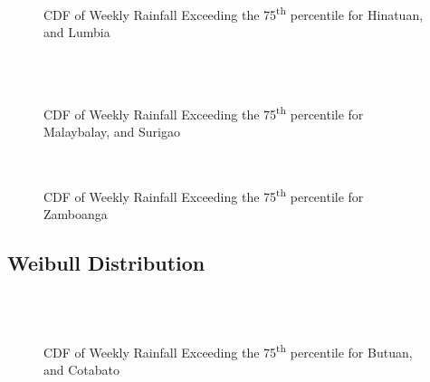 \begin{figure}[H]
  \centering
  \\
  \\
  \caption{CDF of Weekly Rainfall Exceeding the 75\textsuperscript{th} percentile for Hinatuan, and Lumbia}
  \label{fig:weekly_0.90_appendix_gd_pt4}
\end{figure}

\begin{figure}[H]
  \centering
  \\
  \\
  \caption{CDF of Weekly Rainfall Exceeding the 75\textsuperscript{th} percentile for Malaybalay, and Surigao}
  \label{fig:weekly_0.90_appendix_gd_pt5}
\end{figure}

\begin{figure}[H]
  \centering
  \\
  \caption{CDF of Weekly Rainfall Exceeding the 75\textsuperscript{th} percentile for Zamboanga}
  \label{fig:weekly_0.90_appendix_gd_pt6}
\end{figure}

\subsection{Weibull Distribution}

\begin{figure}[H]
  \centering
  \\
  \\
  \caption{CDF of Weekly Rainfall Exceeding the 75\textsuperscript{th} percentile for Butuan, and Cotabato}
  \label{fig:weekly_0.90_appendix_wd_pt1}
\end{figure}

